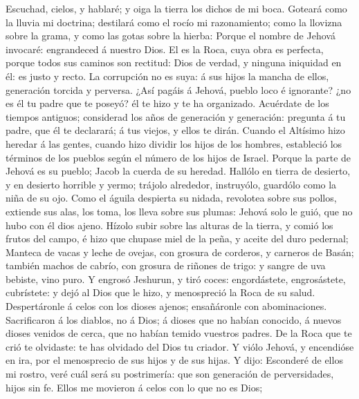  Escuchad, cielos, y hablaré; y oiga la tierra los dichos
de mi boca.  Goteará como la lluvia mi doctrina; destilará
como el rocío mi razonamiento; como la llovizna sobre la grama, y como
las gotas sobre la hierba:  Porque el nombre de Jehová
invocaré: engrandeced á nuestro Dios.  El es la Roca, cuya
obra es perfecta, porque todos sus caminos son rectitud: Dios de verdad,
y ninguna iniquidad en él: es justo y recto.  La
corrupción no es suya: á sus hijos la mancha de ellos, generación
torcida y perversa.  ¿Así pagáis á Jehová, pueblo loco é
ignorante? ¿no es él tu padre que te poseyó? él te hizo y te ha
organizado.  Acuérdate de los tiempos antiguos; considerad
los años de generación y generación: pregunta á tu padre, que él te
declarará; á tus viejos, y ellos te dirán.  Cuando el
Altísimo hizo heredar á las gentes, cuando hizo dividir los hijos de los
hombres, estableció los términos de los pueblos según el número de los
hijos de Israel.  Porque la parte de Jehová es su pueblo;
Jacob la cuerda de su heredad.  Hallólo en tierra de
desierto, y en desierto horrible y yermo; trájolo alrededor, instruyólo,
guardólo como la niña de su ojo.  Como el águila
despierta su nidada, revolotea sobre sus pollos, extiende sus alas, los
toma, los lleva sobre sus plumas:  Jehová solo le guió,
que no hubo con él dios ajeno.  Hízolo subir sobre las
alturas de la tierra, y comió los frutos del campo, é hizo que chupase
miel de la peña, y aceite del duro pedernal;  Manteca de
vacas y leche de ovejas, con grosura de corderos, y carneros de Basán;
también machos de cabrío, con grosura de riñones de trigo: y sangre de
uva bebiste, vino puro.  Y engrosó Jeshurun, y tiró
coces: engordástete, engrosástete, cubrístete: y dejó al Dios que le
hizo, y menospreció la Roca de su salud.  Despertáronle á
celos con los dioses ajenos; ensañáronle con abominaciones.
 Sacrificaron á los diablos, no á Dios; á dioses que no
habían conocido, á nuevos dioses venidos de cerca, que no habían temido
vuestros padres.  De la Roca que te crió te olvidaste: te
has olvidado del Dios tu criador.  Y viólo Jehová, y
encendióse en ira, por el menosprecio de sus hijos y de sus hijas.
 Y dijo: Esconderé de ellos mi rostro, veré cuál será su
postrimería: que son generación de perversidades, hijos sin fe.
 Ellos me movieron á celos con lo que no es Dios;
